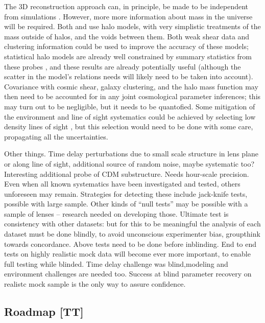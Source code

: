 The 3D reconstruction approach can, in principle, be made to be
independent from simulations \citep[indeed, this was a design feature
of][]{McCullyEtal2014}.  However, more  more information about mass in
the universe will be required.  Both \citet{McCullyEtal2014} and
\citet{CollettEtal2013} use halo models, with very simplistic treatments
of the mass outside of halos, and the voids between them. Both weak
shear data and clustering information could be used to improve the
accuracy of these  models; statistical halo models are already well
constrained by summary statistics from these probes
\citep[e.g.][]{CouponEtal2015},  and these results are already
potentially useful (although the scatter in the model's relations needs
will likely need to be taken into account).  Covariance with cosmic
shear, galaxy clustering, and the halo mass function may then  need to
be accounted for in any joint cosmological parameter inferences; this
may turn out to be negligible, but it needs to be quantofied.  Some
mitigation of the environment and line of sight systematics could be
achieved by selecting low density lines of sight
\citep{CollettEtal2013}, but this selection would need to be done with
some care, propagating all the uncertainties.


Other things. Time delay perturbations due to small scale structure in
lens plane or along line of sight, additional source of random noise,
maybe systematic too? Interesting additional probe of CDM substructure.
Needs hour-scale precision. Even when all known systematics have been
investigated and tested, others unforeseen may remain. Strategies for
detecting these include jack-knife tests, possible with large sample.
Other kinds
of ``null tests'' may be possible with a sample of lenses -- research needed
on developing those.
Ultimate test is consistency with other datasets: but for this to be
meaningful the analysis of each dataset must be done blindly, to avoid
unconscious experimenter bias, groupthink towards concordance.  Above
tests need to be done before inblinding.
End to end tests on highly realistic mock data will become ever more
important, to enable full testing while blinded. Time delay challenge
was blind,modeling and environment challenges are needed too. Success
at blind parameter recovery on realistc mock sample is the only way
to assure confidence.



\subsection{Roadmap [TT]}
\label{ssec:roadmap}

